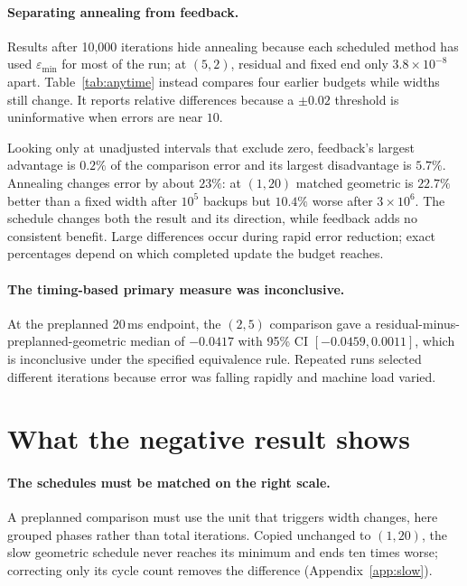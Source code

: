 \documentclass{article}
\begin{document}
\paragraph{Separating annealing from feedback.}
Results after 10,000 iterations hide annealing because each scheduled
method has used $\varepsilon_{\min}$ for most of the run; at $(5,2)$, residual
and fixed end only $3.8\times10^{-8}$ apart.  Table~\ref{tab:anytime} instead
compares four earlier budgets while widths still change.  It reports relative
differences because a $\pm0.02$ threshold is uninformative when errors are near
$10$.

Looking only at unadjusted intervals that exclude zero, feedback's largest
advantage is $0.2\%$ of the comparison error and its largest disadvantage is
$5.7\%$.  Annealing changes error by about $23\%$: at $(1,20)$ matched geometric is
$22.7\%$ better than a fixed width after $10^5$ backups but $10.4\%$ worse after
$3\times10^6$.  The schedule changes both the result and its direction, while
feedback adds no consistent benefit.  Large
differences occur during rapid error reduction; exact percentages depend on
which completed update the budget reaches.

\paragraph{The timing-based primary measure was inconclusive.}
At the preplanned 20\,ms endpoint, the $(2,5)$ comparison gave a
residual-minus-preplanned-geometric median of $-0.0417$ with 95\% CI
$[-0.0459,0.0011]$,
which is inconclusive under the specified equivalence rule.  Repeated runs
selected different iterations because error was falling rapidly and machine
load varied.

\section{What the negative result shows}
\label{sec:isolates}

\paragraph{The schedules must be matched on the right scale.}
A preplanned comparison must use the unit that triggers width changes, here
grouped phases rather than total iterations.  Copied unchanged to $(1,20)$, the
slow geometric schedule never reaches its minimum and ends ten times worse;
correcting only its cycle count removes the difference
(Appendix~\ref{app:slow}).
\end{document}
